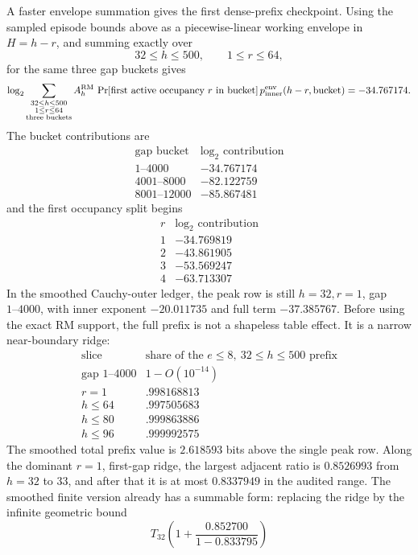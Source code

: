 A faster envelope summation gives the first dense-prefix checkpoint.  Using the sampled episode bounds above as a
piecewise-linear working envelope in \(H=h-r\), and summing exactly over
\[
32\le h\le 500,\qquad 1\le r\le 64,
\]
for the same three gap buckets gives
\[
\log_2 \sum_{\substack{32\le h\le500\\1\le r\le64\\\text{three buckets}}}
A_h^{\rm RM}\,
\Pr[\text{first active occupancy }r\text{ in bucket}]\,
p_{\rm inner}^{\rm env}(h-r,\text{bucket})
=-34.767174.
\]
The bucket contributions are
\[
\begin{array}{c|c}
\text{gap bucket} & \log_2\text{ contribution}\\
\hline
1\text{--}4000 & -34.767174\\
4001\text{--}8000 & -82.122759\\
8001\text{--}12000 & -85.867481
\end{array}
\]
and the first occupancy split begins
\[
\begin{array}{c|c}
r & \log_2\text{ contribution}\\
\hline
1 & -34.769819\\
2 & -43.861905\\
3 & -53.569247\\
4 & -63.713307
\end{array}
\]
In the smoothed Cauchy-outer ledger, the peak row is still \(h=32,r=1\), gap \(1\text{--}4000\), with inner exponent
\(-20.011735\) and full term \(-37.385767\).  Before using the exact RM support, the full prefix is not a shapeless
table effect.  It is a narrow near-boundary ridge:
\[
\begin{array}{c|c}
\text{slice} & \text{share of the }e\le8,\ 32\le h\le500\text{ prefix}\\
\hline
\text{gap }1\text{--}4000 & 1-O(10^{-14})\\
r=1 & .998168813\\
h\le64 & .997505683\\
h\le80 & .999863886\\
h\le96 & .999992575
\end{array}
\]
The smoothed total prefix value is \(2.618593\) bits above the single peak row.  Along the dominant \(r=1\), first-gap ridge,
the largest adjacent ratio is \(0.8526993\) from \(h=32\) to \(33\), and after that it is at most \(0.8337949\) in the
audited range.  The smoothed finite version already has a summable form: replacing the ridge by the infinite
geometric bound
\[
T_{32}\left(1+\frac{0.852700}{1-0.833795}\right)
\]
